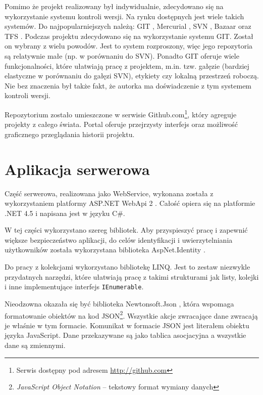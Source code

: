 \documentclass[a4paper]{book}
\begin{document}
			Pomimo że projekt realizowany był indywidualnie, zdecydowano się na wykorzystanie systemu kontroli wersji. Na rynku dostępnych jest wiele takich systemów. Do najpopularniejszych należą: GIT \cite{id:GIT}, Mercurial \cite{id:Mecurial}, SVN \cite{id:SVN}, Bazaar \cite{id:Bazaar} oraz TFS \cite{id:TFS}.
			Podczas projektu zdecydowano się na wykorzystanie systemu GIT. Został on wybrany z wielu powodów. Jest to system rozproszony, więc jego repozytoria są relatywnie małe (np. w porównaniu do SVN). Ponadto GIT oferuje wiele funkcjonalności, które ułatwiają pracę z projektem, m.in. tzw. gałęzie (bardziej elastyczne w porównaniu do gałęzi SVN), etykiety czy lokalną przestrzeń roboczą. Nie bez znaczenia był także fakt, że autorka ma doświadczenie z tym systemem kontroli wersji.

			Repozytorium zostało umieszczone w serwisie Github.com\footnote{Serwis dostępny pod adresem \url{http://github.com}}, który agreguje projekty z całego świata. Portal oferuje przejrzysty interfejs oraz możliwość graficznego przeglądania historii projektu.
		
		\section{Aplikacja serwerowa}
		\label{id:sec:appserv}
		Część serwerowa, realizowana jako WebService, wykonana została z wykorzystaniem platformy ASP.NET WebApi 2 \cite{id:WebApi}. Całość opiera się na platformie .NET 4.5 i napisana jest w języku C\#.
		
		W tej części wykorzystano szereg bibliotek. Aby przyspieszyć pracę i zapewnić większe bezpieczeństwo aplikacji, do celów identyfikacji i uwierzytelniania użytkowników została wykorzystana biblioteka AspNet.Identity \cite{id:ASPIdentity}.
		
		Do pracy z kolekcjami wykorzystano bibliotekę LINQ. Jest to zestaw niezwykle przydatnych narzędzi, które ułatwiają pracę z takimi strukturami jak listy, kolejki i inne implementujące interfejs \texttt{IEnumerable}.
		
		Nieodzowna okazała się być biblioteka Newtonsoft.Json \cite{id:NewtonsoftJSON}, która wspomaga formatowanie obiektów na kod JSON\footnote{\emph{JavaScript Object Notation} -- tekstowy format wymiany danych}. Wszystkie akcje zwracające dane zwracają je właśnie w tym formacie. Komunikat w formacie JSON jest literałem obiektu języka JavaScript. Dane przekazywane są jako tablica asocjacyjna a wszystkie dane są zmiennymi.
		
\end{document}
